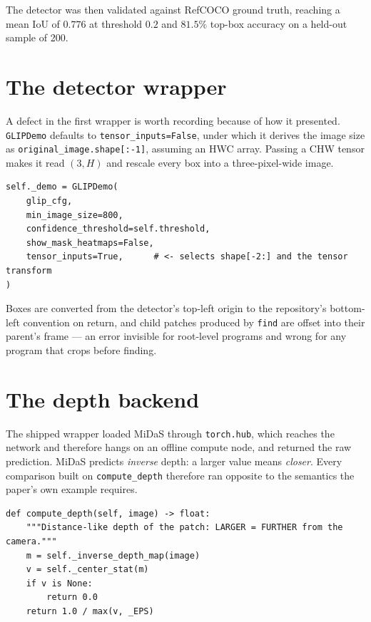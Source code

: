 \documentclass[12pt,a4paper,oneside]{report}
\begin{document}
The detector was then validated against RefCOCO ground truth, reaching a mean IoU of
$0.776$ at threshold $0.2$ and $81.5\%$ top-box accuracy on a held-out sample of 200.

\section{The detector wrapper}

A defect in the first wrapper is worth recording because of how it presented.
\texttt{GLIPDemo} defaults to \texttt{tensor\_inputs=False}, under which it derives the
image size as \texttt{original\_image.shape[:-1]}, assuming an HWC array. Passing a CHW
tensor makes it read $(3, H)$ and rescale every box into a three-pixel-wide image.

\begin{lstlisting}[caption={The one-word correction. Without it, every IoU was
\emph{exactly} zero --- not low, zero --- which is what identified the fault as a
coordinate-space bug rather than a detection-quality problem.}]
self._demo = GLIPDemo(
    glip_cfg,
    min_image_size=800,
    confidence_threshold=self.threshold,
    show_mask_heatmaps=False,
    tensor_inputs=True,      # <- selects shape[-2:] and the tensor transform
)
\end{lstlisting}

Boxes are converted from the detector's top-left origin to the repository's bottom-left
convention on return, and child patches produced by \texttt{find} are offset into their
parent's frame --- an error invisible for root-level programs and wrong for any program
that crops before finding.

\section{The depth backend}
\label{sec:sign}

The shipped wrapper loaded MiDaS through \texttt{torch.hub}, which reaches the network
and therefore hangs on an offline compute node, and returned the raw prediction. MiDaS
predicts \emph{inverse} depth: a larger value means \emph{closer}. Every comparison
built on \texttt{compute\_depth} therefore ran opposite to the semantics the paper's
own example requires.

\begin{lstlisting}[caption={Corrected depth. The inversion lives here and in
\texttt{depth\_of\_region}, and nowhere else; callers are not permitted to read the raw
map, which is what produced three separate sign errors.}]
def compute_depth(self, image) -> float:
    """Distance-like depth of the patch: LARGER = FURTHER from the camera."""
    m = self._inverse_depth_map(image)
    v = self._center_stat(m)
    if v is None:
        return 0.0
    return 1.0 / max(v, _EPS)
\end{lstlisting}
\end{document}

